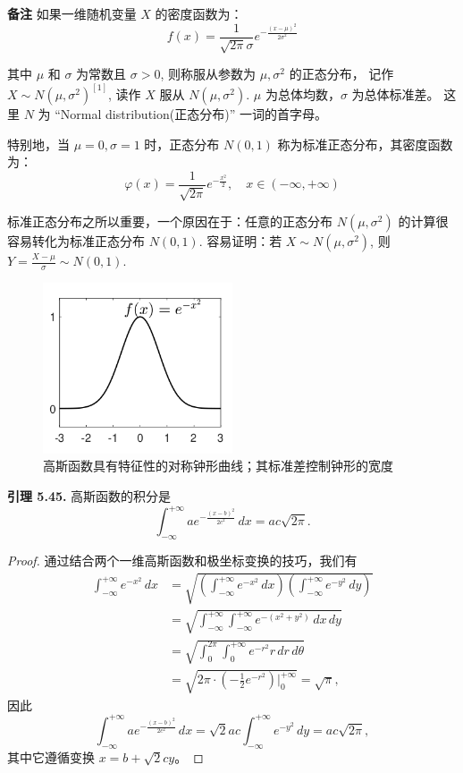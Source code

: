 \documentclass[a4paper]{ctexart}
\begin{document}
{\noindent \textbf{备注 } 如果一维随机变量 $X$ 的密度函数为：
\[ 
  f(x) = \frac{1}{\sqrt{2\pi}\sigma} e^{-\frac{(x-\mu)^2}{2\sigma^2}} 
\]

其中 $\mu$ 和 $\sigma$ 为常数且 $\sigma > 0$, 则称服从参数为 $\mu, \sigma^2$ 的正态分布，
记作 $X \sim N(\mu, \sigma^2)^{[1]}$, 读作 $X$ 服从 $N(\mu, \sigma^2)$. $\mu$ 为总体均数，$\sigma$ 为总体标准差。
这里 $N$ 为 ``Normal distribution(正态分布)'' 一词的首字母。

特别地，当 $\mu = 0, \sigma = 1$ 时，正态分布 $N(0,1)$ 称为标准正态分布，其密度函数为：
\[ 
  \varphi(x) = \frac{1}{\sqrt{2\pi}} e^{-\frac{x^2}{2}}, \quad x \in (-\infty, +\infty) 
\]

标准正态分布之所以重要，一个原因在于：任意的正态分布 $N(\mu, \sigma^2)$ 的计算很容易转化为标准正态分布 $N(0,1)$. 
容易证明：若 $X \sim N(\mu, \sigma^2)$, 则 $Y = \frac{X-\mu}{\sigma} \sim N(0,1)$.

\begin{figure}[h]
  \centering
  \includegraphics[width=0.5\textwidth]{images/gaussian_function.png}
  \caption{高斯函数具有特征性的对称钟形曲线；其标准差控制钟形的宽度}
\end{figure}
  
\noindent \textbf{引理 5.45.} 高斯函数的积分是
\[ 
  \int_{-\infty}^{+\infty} a e^{-\frac{(x-b)^2}{2 c^2}} \, dx = a c \sqrt{2\pi}. \tag{5.43} 
\]

\begin{proof}
通过结合两个一维高斯函数和极坐标变换的技巧，我们有
\begin{align*}
  \int_{-\infty}^{+\infty} e^{-x^2} \, dx &= \sqrt{\left(\int_{-\infty}^{+\infty} e^{-x^2} \, dx\right)\left(\int_{-\infty}^{+\infty} e^{-y^2} \, dy\right)} \\
  &= \sqrt{\int_{-\infty}^{+\infty}\int_{-\infty}^{+\infty} e^{-(x^2+y^2)} \, dx \, dy} \\
  &= \sqrt{\int_0^{2\pi}\int_0^{+\infty} e^{-r^2} r \, dr \, d\theta} \\
  &= \sqrt{2\pi \cdot \left(-\frac{1}{2} e^{-r^2}\right)\bigg|_0^{+\infty}} = \sqrt{\pi},
\end{align*}
因此
\[ 
  \int_{-\infty}^{+\infty} a e^{-\frac{(x-b)^2}{2 c^2}} \, dx = \sqrt{2} a c \int_{-\infty}^{+\infty} e^{-y^2} \, dy = a c \sqrt{2\pi}, 
\]
其中它遵循变换 $x = b + \sqrt{2} c y$。
\end{proof}

}
\end{document}
